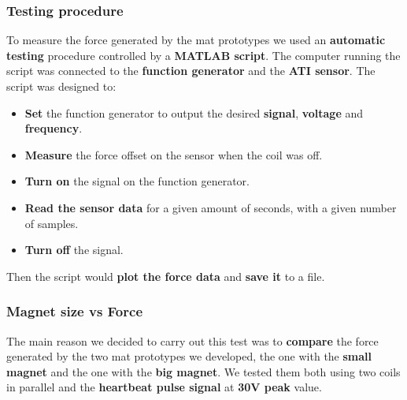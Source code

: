 \subsubsection{Testing procedure}
To measure the force generated by the mat prototypes we used an \textbf{automatic testing} procedure controlled by a \textbf{MATLAB script}.
The computer running the script was connected to the \textbf{function generator} and the \textbf{ATI sensor}.
The script was designed to:
\begin{itemize}
    \item \textbf{Set} the function generator to output the desired \textbf{signal}, \textbf{voltage} and \textbf{frequency}.
    \item \textbf{Measure} the force offset on the sensor when the coil was off.
    \item \textbf{Turn on} the signal on the function generator.
    \item \textbf{Read the sensor data} for a given amount of seconds, with a given number of samples.
    \item \textbf{Turn off} the signal.
\end{itemize}
Then the script would \textbf{plot the force data} and \textbf{save it} to a file.

\subsubsection{Magnet size vs Force}
The main reason we decided to carry out this test was to \textbf{compare} the force generated by the two mat prototypes we developed, the one with the \textbf{small magnet} and the one with the \textbf{big magnet}.
We tested them both using two coils in parallel and the \textbf{heartbeat pulse signal} at \textbf{30V peak} value.

